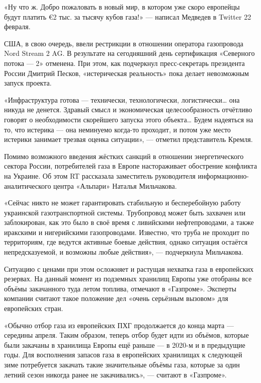«Ну что ж. Добро пожаловать в новый мир, в котором уже скоро европейцы будут платить \euro{}2 тыс. за тысячу кубов газа!» --- написал Медведев в Twitter 22 февраля.

США, в свою очередь, ввели рестрикции в отношении оператора газопровода Nord Stream 2 AG. В результате на сегодняшний день сертификация «Северного потока --- 2» отменена. При этом, как подчеркнул пресс-секретарь президента России Дмитрий Песков, «истерическая реальность» пока делает невозможным запуск проекта.

«Инфраструктура готова --- технически, технологически, логистически… она никуда не денется. Здравый смысл и экономическая целесообразность отчётливо говорят о необходимости скорейшего запуска этого объекта… Будем надеяться на то, что истерика --- она неминуемо когда-то проходит, и потом уже место истерики занимает трезвая оценка ситуации», --- отметил представитель Кремля.

Помимо возможного введения жёстких санкций в отношении энергетического сектора России, потребителей газа в Европе настораживает обострение конфликта на Украине. Об этом RT рассказала заместитель руководителя информационно-аналитического центра «Альпари» Наталья Мильчакова.

«Сейчас никто не может гарантировать стабильную и бесперебойную работу украинской газотранспортной системы. Трубопровод может быть захвачен или заблокирован, как это было в своё время с ливийскими нефтепроводами, а также иракскими и нигерийскими газопроводами. Известно, что труба не проходит по территориям, где ведутся активные боевые действия, однако ситуация остаётся непредсказуемой, и возможны любые действия», --- подчеркнула Мильчакова.

Ситуацию с ценами при этом осложняет и растущая нехватка газа в европейских резервах. На данный момент из подземных хранилищ Европы уже отобраны все объёмы закачанного туда летом топлива, отмечают в «Газпроме». Эксперты компании считают такое положение дел «очень серьёзным вызовом» для европейских стран.

«Обычно отбор газа из европейских ПХГ продолжается до конца марта --- середины апреля. Таким образом, теперь отбор будет идти из объёмов, которые были закачаны в хранилища Европы ещё раньше --- в 2020-м и в предыдущие годы. Для восполнения запасов газа в европейских хранилищах к следующей зиме потребуется закачать такие значительные объёмы газа, которые за один летний сезон никогда ранее не закачивались», --- считают в «Газпроме».

